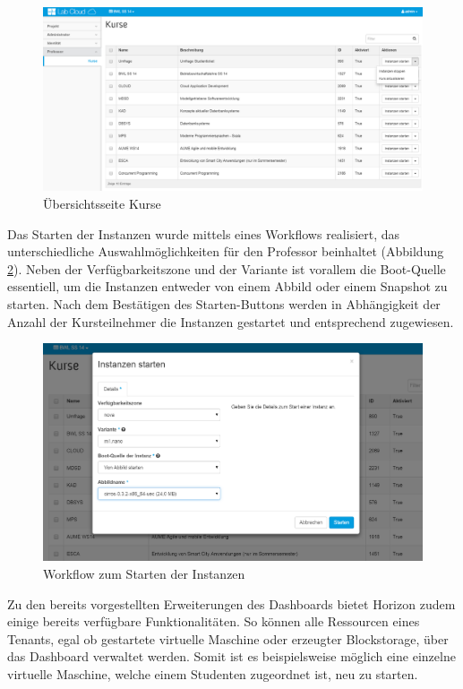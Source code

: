 \begin{figure}[H]
\centering
\includegraphics[scale=0.18]{img/dashboard-courses.png}
\caption{Übersichtsseite Kurse}
\label{dashboard-courses}
\end{figure}

Das Starten der Instanzen wurde mittels eines Workflows realisiert, das unterschiedliche Auswahlmöglichkeiten für den Professor beinhaltet (Abbildung \ref{dashboard-start-instances}). Neben der Verfügbarkeitszone und der Variante ist vorallem die Boot-Quelle essentiell, um die Instanzen entweder von einem Abbild oder einem Snapshot zu starten. Nach dem Bestätigen des Starten-Buttons werden in Abhängigkeit der Anzahl der Kursteilnehmer die Instanzen gestartet und entsprechend zugewiesen.

\begin{figure}[H]
\centering
\includegraphics[scale=0.25]{img/dashboard-start-instances.png}
\caption{Workflow zum Starten der Instanzen}
\label{dashboard-start-instances}
\end{figure}

Zu den bereits vorgestellten Erweiterungen des Dashboards bietet Horizon zudem einige bereits 
verfügbare Funktionalitäten. So können alle Ressourcen eines Tenants, egal ob gestartete virtuelle
Maschine oder erzeugter Blockstorage, über das Dashboard verwaltet werden. Somit ist es  
beispielsweise möglich eine einzelne virtuelle Maschine, welche einem Studenten zugeordnet ist,
neu zu starten.

